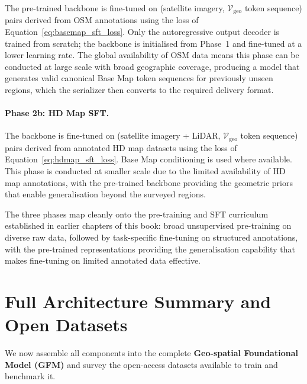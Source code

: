 \documentclass{book}
\begin{document}
The pre-trained backbone is fine-tuned on
(satellite imagery, $\mathcal{V}_{\text{geo}}$ token sequence)
pairs derived from OSM annotations using the loss of
Equation~\eqref{eq:basemap_sft_loss}.  Only the autoregressive
output decoder is trained from scratch; the backbone is
initialised from Phase~1 and fine-tuned at a lower learning
rate.  The global availability of OSM data means this phase
can be conducted at large scale with broad geographic
coverage, producing a model that generates valid canonical
Base Map token sequences for previously unseen regions, which
the serializer then converts to the required delivery format.

\paragraph{Phase 2b: HD Map SFT.}

The backbone is fine-tuned on (satellite imagery + LiDAR,
$\mathcal{V}_{\text{geo}}$ token sequence) pairs derived from
annotated HD map datasets using the loss of
Equation~\eqref{eq:hdmap_sft_loss}.  Base Map conditioning
is used where available.  This phase is conducted at smaller
scale due to the limited availability of HD map annotations,
with the pre-trained backbone providing the geometric priors
that enable generalisation beyond the surveyed regions.

The three phases map cleanly onto the pre-training and SFT
curriculum established in earlier chapters of this book:
broad unsupervised pre-training on diverse raw data, followed
by task-specific fine-tuning on structured annotations, with
the pre-trained representations providing the generalisation
capability that makes fine-tuning on limited annotated data
effective.

\section{Full Architecture Summary and Open Datasets}
\label{sec:architecture_summary}

We now assemble all components into the complete
\textbf{Geo-spatial Foundational Model (GFM)} and survey the
open-access datasets available to train and benchmark it.
\end{document}
